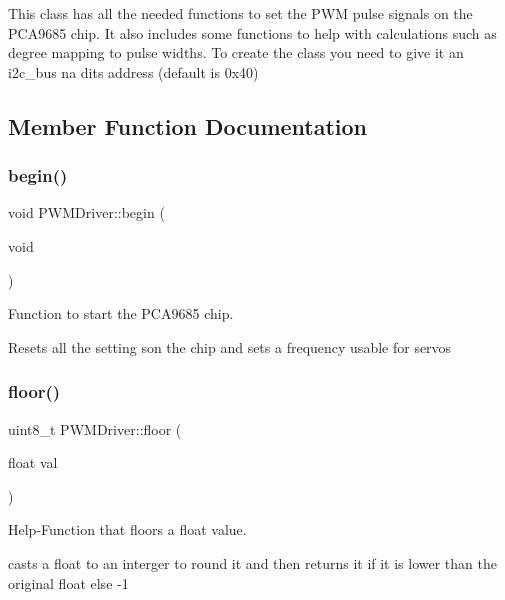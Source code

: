 This class has all the needed functions to set the P\+WM pulse signals on the P\+C\+A9685 chip. It also includes some functions to help with calculations such as degree mapping to pulse widths. To create the class you need to give it an i2c\+\_\+bus na dits address (default is 0x40) 

\subsection{Member Function Documentation}
\mbox{\label{classPWMDriver_ad04b5d0815c1d37934ea7f94a04cfe37}} 
\subsubsection{\texorpdfstring{begin()}{begin()}}
{\footnotesize\ttfamily void P\+W\+M\+Driver\+::begin (\begin{DoxyParamCaption}\item[{void}]{ }\end{DoxyParamCaption})}



Function to start the P\+C\+A9685 chip. 

Resets all the setting son the chip and sets a frequency usable for servos \mbox{\label{classPWMDriver_a16751ee4ff51c2deda6f9c4efbc8c869}} 
\subsubsection{\texorpdfstring{floor()}{floor()}}
{\footnotesize\ttfamily uint8\+\_\+t P\+W\+M\+Driver\+::floor (\begin{DoxyParamCaption}\item[{float}]{val }\end{DoxyParamCaption})}



Help-\/\+Function that floors a float value. 

casts a float to an interger to round it and then returns it if it is lower than the original float else -\/1 \mbox{\label{classPWMDriver_a9f1afb5b4d6bf18bb2c4b591f310a149}} 

